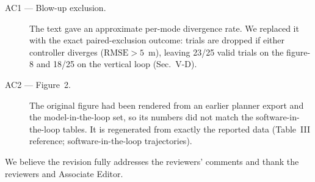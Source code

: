 \documentclass[11pt]{article}
\begin{document}
\begin{description}
\item[AC1 --- Blow-up exclusion.] The text gave an approximate per-mode
divergence rate. We replaced it with the exact paired-exclusion outcome:
trials are dropped if either controller diverges ($\text{RMSE}>5$~m),
leaving 23/25 valid trials on the figure-8 and 18/25 on the vertical loop
(Sec.~V-D).
\item[AC2 --- Figure~2.] The original figure had been rendered from an
earlier planner export and the model-in-the-loop set, so its numbers did
not match the software-in-the-loop tables. It is regenerated from exactly
the reported data (Table~III reference; software-in-the-loop trajectories).
\end{description}

\medskip
\noindent We believe the revision fully addresses the reviewers' comments
and thank the reviewers and Associate Editor.
\end{document}
